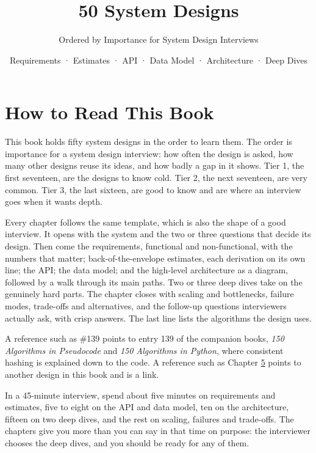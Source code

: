 \documentclass[
  letterpaper,
  oneside,
  11pt,
  openany]{scrbook}
\title{50 System Designs}
\subtitle{Ordered by Importance for System Design Interviews}
\author{}
\date{Requirements · Estimates · API · Data Model · Architecture · Deep
Dives}
\begin{document}
\frontmatter
\maketitle

{
\hypersetup{linkcolor=ink}
\setcounter{tocdepth}{1}
\tableofcontents
}
\mainmatter
\chapter{How to Read This Book}\label{how-to-read}


This book holds fifty system designs in the order to learn them. The
order is importance for a system design interview: how often the design
is asked, how many other designs reuse its ideas, and how badly a gap in
it shows. Tier 1, the first seventeen, are the designs to know cold.
Tier 2, the next seventeen, are very common. Tier 3, the last sixteen,
are good to know and are where an interview goes when it wants depth.

Every chapter follows the same template, which is also the shape of a
good interview. It opens with the system and the two or three questions
that decide its design. Then come the requirements, functional and
non-functional, with the numbers that matter; back-of-the-envelope
estimates, each derivation on its own line; the API; the data model; and
the high-level architecture as a diagram, followed by a walk through its
main paths. Two or three deep dives take on the genuinely hard parts.
The chapter closes with scaling and bottlenecks, failure modes,
trade-offs and alternatives, and the follow-up questions interviewers
actually ask, with crisp answers. The last line lists the algorithms the
design uses.

A reference such as \#139 points to entry 139 of the companion books,
\emph{150 Algorithms in Pseudocode} and \emph{150 Algorithms in Python},
where consistent hashing is explained down to the code. A reference such
as Chapter \hyperref[d5]{5} points to another design in this book and is
a link.

In a 45-minute interview, spend about five minutes on requirements and
estimates, five to eight on the API and data model, ten on the
architecture, fifteen on two deep dives, and the rest on scaling,
failures and trade-offs. The chapters give you more than you can say in
that time on purpose: the interviewer chooses the deep dives, and you
should be ready for any of them.
\end{document}
